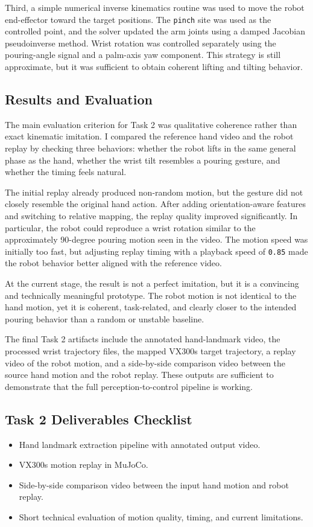 \documentclass[11pt,a4paper]{article}
\begin{document}
Third, a simple numerical inverse kinematics routine was used to move the robot end-effector toward the target positions. The \texttt{pinch} site was used as the controlled point, and the solver updated the arm joints using a damped Jacobian pseudoinverse method. Wrist rotation was controlled separately using the pouring-angle signal and a palm-axis yaw component. This strategy is still approximate, but it was sufficient to obtain coherent lifting and tilting behavior.

\subsection{Results and Evaluation}
The main evaluation criterion for Task 2 was qualitative coherence rather than exact kinematic imitation. I compared the reference hand video and the robot replay by checking three behaviors: whether the robot lifts in the same general phase as the hand, whether the wrist tilt resembles a pouring gesture, and whether the timing feels natural.

The initial replay already produced non-random motion, but the gesture did not closely resemble the original hand action. After adding orientation-aware features and switching to relative mapping, the replay quality improved significantly. In particular, the robot could reproduce a wrist rotation similar to the approximately 90-degree pouring motion seen in the video. The motion speed was initially too fast, but adjusting replay timing with a playback speed of \texttt{0.85} made the robot behavior better aligned with the reference video.

At the current stage, the result is not a perfect imitation, but it is a convincing and technically meaningful prototype. The robot motion is not identical to the hand motion, yet it is coherent, task-related, and clearly closer to the intended pouring behavior than a random or unstable baseline.

The final Task 2 artifacts include the annotated hand-landmark video, the processed wrist trajectory files, the mapped VX300s target trajectory, a replay video of the robot motion, and a side-by-side comparison video between the source hand motion and the robot replay. These outputs are sufficient to demonstrate that the full perception-to-control pipeline is working.

\subsection{Task 2 Deliverables Checklist}
\begin{itemize}[leftmargin=1.5em]
	\item Hand landmark extraction pipeline with annotated output video.
	\item VX300s motion replay in MuJoCo.
	\item Side-by-side comparison video between the input hand motion and robot replay.
	\item Short technical evaluation of motion quality, timing, and current limitations.
\end{itemize}
\end{document}

